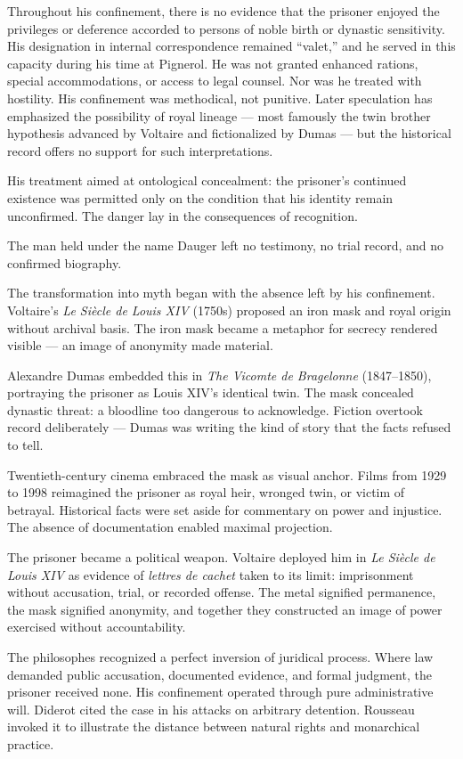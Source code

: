 Throughout his confinement, there is no evidence that the prisoner enjoyed the privileges or deference accorded to persons of noble birth or dynastic sensitivity. His designation in internal correspondence remained “valet,” and he served in this capacity during his time at Pignerol. He was not granted enhanced rations, special accommodations, or access to legal counsel. Nor was he treated with hostility. His confinement was methodical, not punitive. Later speculation has emphasized the possibility of royal lineage — most famously the twin brother hypothesis advanced by Voltaire and fictionalized by Dumas — but the historical record offers no support for such interpretations.

His treatment aimed at ontological concealment: the prisoner's continued existence was permitted only on the condition that his identity remain unconfirmed. The danger lay in the consequences of recognition.

The man held under the name Dauger left no testimony, no trial record, and no confirmed biography. 

The transformation into myth began with the absence left by his confinement. Voltaire's \textit{Le Siècle de Louis XIV} (1750s) proposed an iron mask and royal origin without archival basis. The iron mask became a metaphor for secrecy rendered visible — an image of anonymity made material.

Alexandre Dumas embedded this in \textit{The Vicomte de Bragelonne} (1847–1850), portraying the prisoner as Louis XIV's identical twin. The mask concealed dynastic threat: a bloodline too dangerous to acknowledge. Fiction overtook record deliberately — Dumas was writing the kind of story that the facts refused to tell.

Twentieth-century cinema embraced the mask as visual anchor. Films from 1929 to 1998 reimagined the prisoner as royal heir, wronged twin, or victim of betrayal. Historical facts were set aside for commentary on power and injustice. The absence of documentation enabled maximal projection.

The prisoner became a political weapon. Voltaire deployed him in \textit{Le Siècle de Louis XIV} as evidence of \textit{lettres de cachet} taken to its limit: imprisonment without accusation, trial, or recorded offense. The metal signified permanence, the mask signified anonymity, and together they constructed an image of power exercised without accountability.

The philosophes recognized a perfect inversion of juridical process. Where law demanded public accusation, documented evidence, and formal judgment, the prisoner received none. His confinement operated through pure administrative will. Diderot cited the case in his attacks on arbitrary detention. Rousseau invoked it to illustrate the distance between natural rights and monarchical practice.


